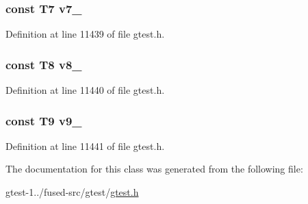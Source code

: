 \hypertarget{classtesting_1_1internal_1_1ValueArray24_a4063f0b7a528133d018ee488ba44a9a3}{
\subsubsection[{v7\-\_\-}]{\setlength{\rightskip}{0pt plus 5cm}const \-T7 {\bf v7\-\_\-}}}\label{d0/da4/classtesting_1_1internal_1_1ValueArray24_a4063f0b7a528133d018ee488ba44a9a3}


\-Definition at line 11439 of file gtest.\-h.

\hypertarget{classtesting_1_1internal_1_1ValueArray24_a596bc5260b2474271d1f6910ff6f665d}{
\subsubsection[{v8\-\_\-}]{\setlength{\rightskip}{0pt plus 5cm}const \-T8 {\bf v8\-\_\-}}}\label{d0/da4/classtesting_1_1internal_1_1ValueArray24_a596bc5260b2474271d1f6910ff6f665d}


\-Definition at line 11440 of file gtest.\-h.

\hypertarget{classtesting_1_1internal_1_1ValueArray24_a6356e16cf54a9dfac8525f20242af31e}{
\subsubsection[{v9\-\_\-}]{\setlength{\rightskip}{0pt plus 5cm}const \-T9 {\bf v9\-\_\-}}}\label{d0/da4/classtesting_1_1internal_1_1ValueArray24_a6356e16cf54a9dfac8525f20242af31e}


\-Definition at line 11441 of file gtest.\-h.



\-The documentation for this class was generated from the following file\-:\begin{DoxyCompactItemize}
\item 
gtest-\/1../fused-\/src/gtest/\hyperlink{fused-src_2gtest_2gtest_8h}{gtest.\-h}\end{DoxyCompactItemize}

